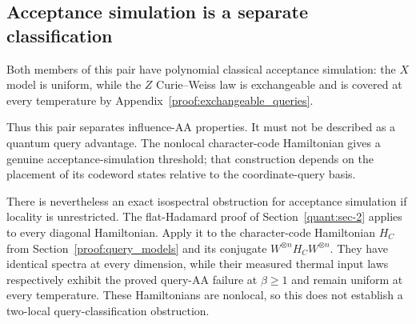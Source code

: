 \subsection{Acceptance simulation is a separate
classification}\label{quant:sec-5}

Both members of this pair have polynomial classical acceptance
simulation: the \(X\) model is uniform, while the \(Z\) Curie--Weiss law
is exchangeable and is covered at every temperature by
Appendix~\ref{proof:exchangeable_queries}.

Thus this pair separates influence-AA properties. It must not be
described as a quantum query advantage. The nonlocal character-code
Hamiltonian gives a genuine acceptance-simulation threshold; that
construction depends on the placement of its codeword states relative to
the coordinate-query basis.

There is nevertheless an exact isospectral obstruction for acceptance
simulation if locality is unrestricted. The flat-Hadamard proof of
Section~\ref{quant:sec-2} applies to every diagonal
Hamiltonian. Apply it to the character-code Hamiltonian \(H_C\) from
Section~\ref{proof:query_models} and its conjugate
\(W^{\otimes n}H_CW^{\otimes n}\). They have identical spectra at every
dimension, while their measured thermal input laws respectively exhibit
the proved query-AA failure at \(\beta\ge1\) and remain uniform at every
temperature. These Hamiltonians are nonlocal, so this does not establish
a two-local query-classification obstruction.
